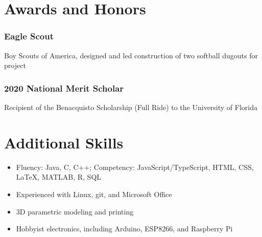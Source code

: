 \documentclass{article}
\newenvironment{CustomItemize}
{ \begin{itemize}[leftmargin=0em]
    \setlength{\itemsep}{0pt}
    \setlength{\parskip}{0pt}
    \setlength{\parindent}{0pt}
    \setlength{\parsep}{0pt}     }
{ \end{itemize}                  }
\begin{document}


\section{Awards and Honors}

\subsubsection{Eagle Scout}
Boy Scouts of America,
designed and led construction of two softball dugouts for project

\subsubsection{2020 National Merit Scholar}
Recipient of the Benacquisto Scholarship (Full Ride) to the University of Florida

\section{Additional Skills}
\begin{CustomItemize}
\item Fluency: Java, C, C++; Competency: JavaScript/TypeScript, HTML, CSS, \LaTeX{}, MATLAB, R, SQL
\item Experienced with Linux, git, and Microsoft Office
\item 3D parametric modeling and printing
\item Hobbyist electronics, including Arduino, ESP8266, and Raspberry Pi

\end{CustomItemize}

\end{document}
